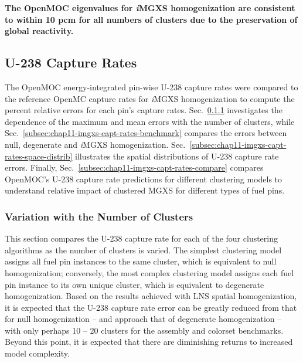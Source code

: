 \addtocounter{footnote}{-2}


\vspace{-0.05in}

\begin{emphbox}
\textbf{The OpenMOC eigenvalues for \textit{i}\ac{MGXS} homogenization are consistent to within 10 \ac{pcm}  for all numbers of clusters due to the preservation of global reactivity.}
\end{emphbox}

\clearpage

\subsection{U-238 Capture Rates}
\label{subsec:chap11-imgxs-capt-rates}

The OpenMOC energy-integrated pin-wise U-238 capture rates were compared to the reference OpenMC capture rates for \textit{i}\ac{MGXS} homogenization to compute the percent relative errors for each pin's capture rates. Sec.~\ref{subsec:chap11-imgxs-capt-rates-num-clusters} investigates the dependence of the maximum and mean errors with the number of clusters, while Sec.~\ref{subsec:chap11-imgxs-capt-rates-benchmark} compares the errors between null, degenerate and \textit{i}\ac{MGXS} homogenization. Sec.~\ref{subsec:chap11-imgxs-capt-rates-space-distrib} illustrates the spatial distributions of U-238 capture rate errors. Finally, Sec.~\ref{subsec:chap11-imgxs-capt-rates-compare} compares OpenMOC's U-238 capture rate predictions for different clustering models to understand relative impact of clustered \ac{MGXS} for different types of fuel pins.

\subsubsection{Variation with the Number of Clusters}
\label{subsec:chap11-imgxs-capt-rates-num-clusters}

This section compares the U-238 capture rate for each of the four clustering algorithms as the number of clusters is varied. The simplest clustering model assigns all fuel pin instances to the same cluster, which is equivalent to null homogenization; conversely, the most complex clustering model assigns each fuel pin instance to its own unique cluster, which is equivalent to degenerate homogenization. Based on the results achieved with \ac{LNS} spatial homogenization, it is expected that the U-238 capture rate error can be greatly reduced from that for null homogenization -- and approach that of degenerate homogenization -- with only perhaps 10 -- 20 clusters for the assembly and colorset benchmarks. Beyond this point, it is expected that there are diminishing returns to increased model complexity. 

